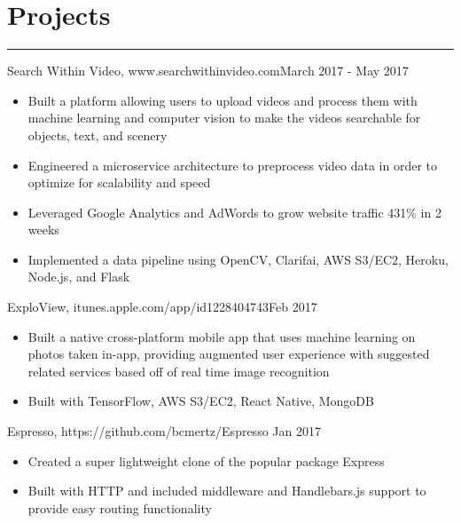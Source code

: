 \documentclass[12pt]{article}
\begin{document}
\vspace{-0.50cm}
\section*{Projects}
\vspace{-0.2cm}
\hrule
\vspace{0.25cm}

\noindent Search Within Video, www.searchwithinvideo.com\hfill March 2017 - May 2017
\vspace{-0.2cm}
\begin{itemize}
  \itemsep-0.4em
        \item Built a platform allowing users to upload videos and process them with machine learning and computer vision to make the videos searchable for objects, text, and scenery
	\item Engineered a microservice architecture to preprocess video data in order to optimize for scalability and speed
	\item Leveraged Google Analytics and AdWords to grow website traffic 431\% in 2 weeks
        \item Implemented a data pipeline using OpenCV, Clarifai, AWS S3/EC2, Heroku, Node.js, and Flask
\end{itemize}


\noindent ExploView, itunes.apple.com/app/id1228404743\hfill Feb 2017
\vspace{-0.2cm}
\begin{itemize}
  \itemsep-0.4em
        \item Built a native cross-platform mobile app that uses machine learning on photos taken in-app, providing augmented user experience with suggested related services based off of real time image recognition
	\item Built with TensorFlow, AWS S3/EC2, React Native, MongoDB
\end{itemize}


\noindent Espresso, https://github.com/bcmertz/Espresso \hfill Jan 2017
\vspace{-0.2cm}
\begin{itemize}
  \itemsep-0.4em
        \item Created a super lightweight clone of the popular package Express
	\item Built with HTTP and included middleware and Handlebars.js support to provide easy routing functionality
\end{itemize}
\end{document}
